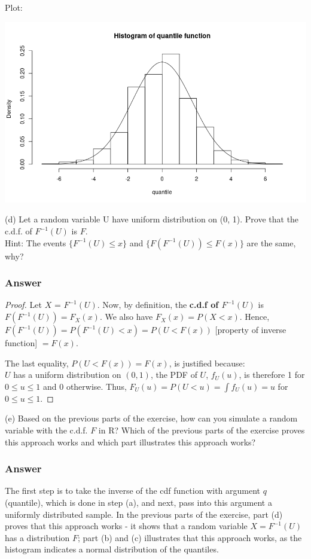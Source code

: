 \documentclass[12pt]{article}
\begin{document}
Plot:

\includegraphics[width=\textwidth]{Ex4Plot2} 


(d) Let a random variable U have uniform distribution on (0, 1). Prove that the c.d.f. of $F^{-1}(U)$ is $F$.\\
Hint: The events $\{F^{-1}(U) \leq x\}$ and $\{F(F^{-1}(U)) \leq F(x)\}$ are the same, why?
\subsubsection*{Answer}
\begin{proof}
Let $X$ = $F^{-1}(U)$. Now, by definition, the \textbf{c.d.f of $F^{-1}(U)$} is $F(F^{-1}(U)) = F_{X}(x)$. We also have $F_{X}(x) = P(X < x)$. Hence, $F(F^{-1}(U)) = P(F^{-1}(U) < x) = P(U < F(x))$ [property of inverse function] $= F(x)$.

The last equality, $P(U < F(x)) = F(x)$, is justified because:\\
$U$ has a uniform distribution on $(0,1)$, the PDF of $U$, $f_{U}(u)$, is therefore 1 for $0 \leq u \leq 1$ and 0 otherwise. Thus, $F_{U}(u) = P(U < u) = \int f_{U}(u) = u$ for $0 \leq u \leq 1$. 
\end{proof}
(e) Based on the previous parts of the exercise, how can you simulate a random variable with the c.d.f. $F$ in R? Which of the previous parts of the exercise proves this approach works and which part illustrates this approach works?

\subsubsection*{Answer}
The first step is to take the inverse of the cdf function with argument $q$ (quantile), which is done in step (a), and next, pass into this argument a uniformly distributed sample. In the previous parts of the exercise, part (d) proves that this approach works - it shows that a random variable $X = F^{-1}(U)$ has a distribution $F$; part (b) and (c) illustrates that this approach works, as the histogram indicates a normal distribution of the quantiles.
\end{document}

